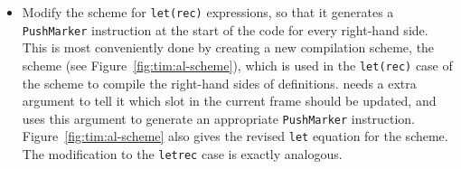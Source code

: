 \begin{itemize}
\item
Modify the \tR{} scheme for \mbox{\tt let(rec)} expressions, so that it generates
a \mbox{\tt PushMarker} instruction at the start of the code for every right-hand
side.
This is most conveniently done by creating a new compilation scheme,
the \tAL{} scheme (see Figure~\ref{fig:tim:al-scheme}),
which is used in the \mbox{\tt let(rec)} case of the \tR{}
scheme to compile the right-hand sides of definitions.
\tAL{} needs a extra argument to tell it which slot in the current
frame should be updated, and uses this argument to generate an
appropriate \mbox{\tt PushMarker} instruction.
Figure~\ref{fig:tim:al-scheme} also gives the revised \mbox{\tt let} equation for
the \tR{} scheme.  The modification to the \mbox{\tt letrec} case is exactly
analogous.
\end{itemize}
